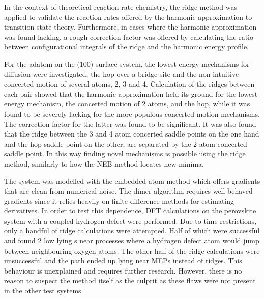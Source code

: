 In the context of theoretical reaction rate chemistry, the ridge method was applied to validate the reaction rates offered by the harmonic approximation to transition state theory.
Furthermore, in cases where the harmonic approximation was found lacking, a rough correction factor was offered by calculating the ratio between configurational integrals of the ridge and the harmonic energy profile.

For the  adatom on the (100) surface system, the lowest energy mechanisms for diffusion were investigated, the hop over a bridge site and the non-intuitive concerted motion of several atoms, 2, 3 and 4.
Calculation of the ridges between each pair showed that the harmonic approximation held its ground for the lowest energy mechanism, the concerted motion of 2 atoms, and the hop, while it was found to be severely lacking for the more populous concerted motion mechanisms.
The correction factor for the latter was found to be significant.
It was also found that the ridge between the 3 and 4 atom concerted saddle points on the one hand and the hop saddle point on the other, are separated by the 2 atom concerted saddle point.
In this way finding novel mechanisms is possible using the ridge method, similarly to how the NEB method locates new minima.

The  system was modelled with the embedded atom method which offers gradients that are clean from numerical noise.
The dimer algorithm requires well behaved gradients since it relies heavily on finite difference methods for estimating derivatives.
In order to test this dependence, DFT calculations on the  perovskite system with a coupled hydrogen defect were performed.
Due to time restrictions, only a handful of ridge calculations were attempted.
Half of which were successful and found 2 low lying s near processes where a hydrogen defect atom would jump between neighbouring oxygen atoms.
The other half of the ridge calculations were unsuccessful and the path ended up lying near MEPs instead of ridges.
This behaviour is unexplained and requires further research.
However, there is no reason to suspect the method itself as the culprit as these flaws were not present in the other test systems.


